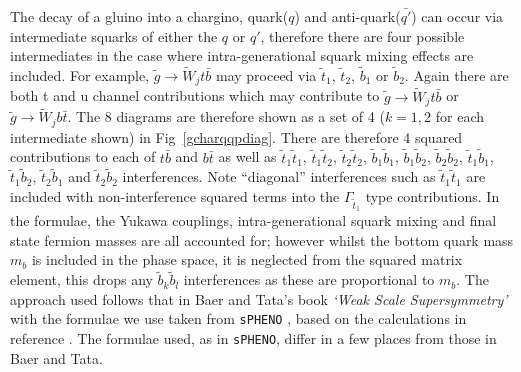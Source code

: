 \documentclass[final,3p,times]{elsarticle}
\begin{document}
The decay of a gluino into a chargino, quark($q$) and anti-quark($\bar{q'}$) can occur via intermediate squarks of either the $q$ or $q'$, therefore there are four possible intermediates in the case where intra-generational squark mixing effects are included. For example, $\tilde{g} \rightarrow \tilde{W}_j t \bar{b}$ may proceed via $\tilde{t}_1$, $\tilde{t}_2$, $\tilde{b}_1$ or $\tilde{b}_2$. Again there are both t and u channel contributions which may contribute to $\tilde{g} \rightarrow \tilde{W}_j t \bar{b}$ or $\tilde{g} \rightarrow \tilde{W}_j b \bar{t}$. The 8 diagrams are therefore shown as a set of 4 ($k = 1,2$ for each intermediate shown) in Fig~\ref{gcharqqpdiag}. There are therefore 4 squared contributions to each of $t \bar{b}$ and $b \bar{t}$ as well as $\tilde{t}_1 \tilde{t}_1$, $\tilde{t}_1 \tilde{t}_2$, $\tilde{t}_2 \tilde{t}_2$, $\tilde{b}_1 \tilde{b}_1$, $\tilde{b}_1 \tilde{b}_2$, $\tilde{b}_2 \tilde{b}_2$, $\tilde{t}_1 \tilde{b}_1$, $\tilde{t}_1 \tilde{b}_2$, $\tilde{t}_2 \tilde{b}_1$ and $\tilde{t}_2 \tilde{b}_2$ interferences. Note ``diagonal'' interferences such as $\tilde{t}_1 \tilde{t}_1$ are included with non-interference squared terms into the $\Gamma_{\tilde{t}_1}$ type contributions.  In the formulae, the Yukawa couplings, intra-generational squark mixing and final state fermion masses are all accounted for; however whilst the bottom quark mass $m_b$ is included in the phase space, it is neglected from the squared matrix element, this drops any $\tilde{b}_k \tilde{b}_l$ interferences as these are proportional to $m_b$. The approach used follows that in Baer and Tata's book \emph{`Weak Scale Supersymmetry'} \cite{TataBaer} with the formulae we use taken from {\tt sPHENO} \cite{Porod:2003um,Porod:2011}, based on the calculations in reference \cite{Baer:1998}. The formulae used, as in {\tt sPHENO}, differ in a few places from those in Baer and Tata.
\end{document}
